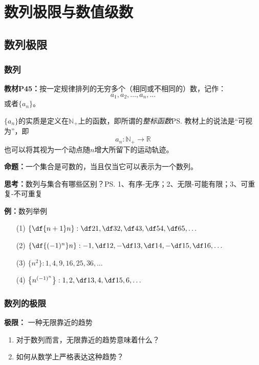 \setcounter{chapter}{1}

\chapter{数列极限与数值级数}

\section{数列极限}

\subsection{数列}

{\bf 教材P45：}按一定规律排列的无穷多个（相同或不相同的）数，记作：
$$a_1,a_2,\ldots,a_n,\ldots$$
或者$\{a_n\}$。

$\{a_n\}$的实质是定义在$\mathbb{N}_+$上的函数，即所谓的{\it 整标函数}\ps{教材上的说法是“可视为”}，即
$$a_n:\mathbb{N}_+\to\mathbb{R}$$
也可以将其视为一个动点随$n$增大所留下的运动轨迹。

{\bf 命题：}一个集合是可数的，当且仅当它可以表示为一个数列。

{\bf 思考：}数列与集合有哪些区别？\ps{1、有序-无序；2、无限-可能有限；3、可重复-不可重复}

{\bf 例：}数列举例

\begin{enumerate}[(1)]
  \setlength{\itemindent}{1cm}
  \item[(1)] $\left\{\df{n+1}n\right\}:\df 21,\df 32,\df43,\df54,\df65,\ldots$
  \item[(2)] $\left\{\df{(-1)^n}n\right\}:-1,\df12,-\df13,\df14,-\df15,\df16,\ldots$
  \item[(3)] $\{n^2\}:1,4,9,16,25,36,\ldots$
  \item[(4)] $\left\{n^{(-1)^n}\right\}:1,2,\df13,4,\df15,6,\ldots$
\end{enumerate}

\subsection{数列的极限}

{\bf 极限：} 一种无限靠近的趋势 
	
\begin{enumerate}
  \setlength{\itemindent}{1cm}
  \item 对于数列而言，无限靠近的趋势意味着什么？ 
  \item 如何从数学上严格表达这种趋势？ 
\end{enumerate}


